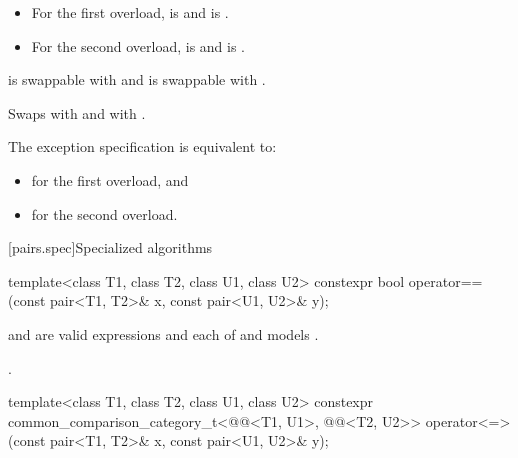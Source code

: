 \begin{itemdescr}
\pnum
\mandates
\begin{itemize}
\item
For the first overload,
 is  and
 is .
\item
For the second overload,
 is  and
 is .
\end{itemize}

\pnum
\expects
{} is swappable with  and
 is swappable with .

\pnum
\effects
Swaps
 with  and
 with .

\pnum
\remarks
The exception specification is equivalent to:
\begin{itemize}
\item
{}
for the first overload, and
\item
{}
for the second overload.
\end{itemize}
\end{itemdescr}

[pairs.spec]{Specialized algorithms}

%
\begin{itemdecl}
template<class T1, class T2, class U1, class U2>
  constexpr bool operator==(const pair<T1, T2>& x, const pair<U1, U2>& y);
\end{itemdecl}

\begin{itemdescr}
\pnum
\constraints
{} and  are
valid expressions and
each of  and
 models .

\pnum
\returns
{}.
\end{itemdescr}

%
\begin{itemdecl}
template<class T1, class T2, class U1, class U2>
  constexpr common_comparison_category_t<@@<T1, U1>,
                                         @@<T2, U2>>
    operator<=>(const pair<T1, T2>& x, const pair<U1, U2>& y);
\end{itemdecl}

